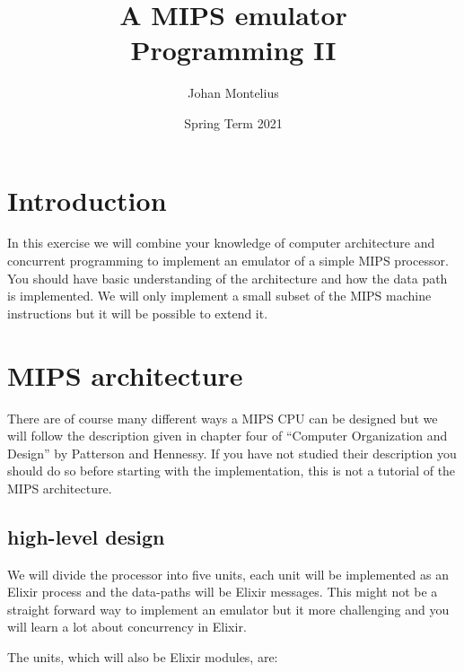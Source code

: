 \documentclass[a4paper,11pt]{article}
\begin{document}
\title{
    \textbf{A MIPS emulator}\\
    \large{Programming II}
}
\author{Johan Montelius}
\date{Spring Term 2021}
\maketitle
{}

\section*{Introduction}

In this exercise we will combine your knowledge of computer
architecture and concurrent programming to implement an emulator of a
simple MIPS processor. You should have basic understanding of the
architecture and how the data path is implemented. We will only
implement a small subset of the MIPS machine instructions but it will
be possible to extend it.

\section{MIPS architecture}

There are of course many different ways a MIPS CPU can be designed but
we will follow the description given in chapter four of ``Computer
Organization and Design'' by Patterson and Hennessy. If you have not
studied their description you should do so before starting with the
implementation, this is not a tutorial of the MIPS architecture.


\subsection*{high-level design}

We will divide the processor into five units, each unit will be
implemented as an Elixir process and the data-paths will be Elixir
messages. This might not be a straight forward way to implement an
emulator but it more challenging and you will learn a lot about
concurrency in Elixir.

The units, which will also be Elixir modules, are:
\end{document}

